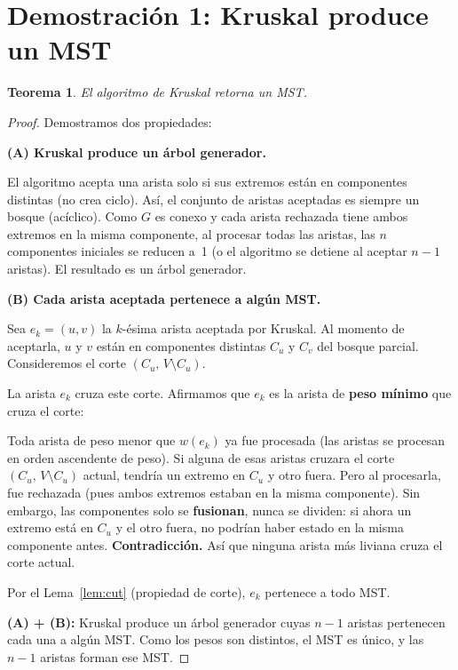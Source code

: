 \documentclass[11pt, letterpaper]{article}
\theoremstyle{definition}
\theoremstyle{plain}
\newtheorem{theorem}{Teorema}[section]
\theoremstyle{remark}
\begin{document}
\section{Demostración 1: Kruskal produce un MST}

\begin{theorem}\label{thm:kruskal}
El algoritmo de Kruskal retorna un MST.
\end{theorem}

\begin{proof}
Demostramos dos propiedades:

\textbf{(A) Kruskal produce un árbol generador.}

El algoritmo acepta una arista solo si sus extremos están en
componentes distintas (no crea ciclo). Así, el conjunto de aristas
aceptadas es siempre un bosque (acíclico). Como $G$ es conexo y
cada arista rechazada tiene ambos extremos en la misma componente,
al procesar todas las aristas, las $n$ componentes iniciales se
reducen a~1 (o el algoritmo se detiene al aceptar $n - 1$ aristas).
El resultado es un árbol generador. \checkmark

\textbf{(B) Cada arista aceptada pertenece a algún MST.}

Sea $e_k = (u, v)$ la $k$-ésima arista aceptada por Kruskal. Al
momento de aceptarla, $u$ y $v$ están en componentes distintas
$C_u$ y $C_v$ del bosque parcial. Consideremos el corte
$(C_u,\, V \setminus C_u)$.

La arista $e_k$ cruza este corte. Afirmamos que $e_k$ es la arista
de \textbf{peso mínimo} que cruza el corte:

Toda arista de peso menor que $w(e_k)$ ya fue procesada (las
aristas se procesan en orden ascendente de peso). Si alguna de esas
aristas cruzara el corte $(C_u,\, V \setminus C_u)$ actual,
tendría un extremo en $C_u$ y otro fuera. Pero al procesarla, fue
rechazada (pues ambos extremos estaban en la misma componente). Sin
embargo, las componentes solo se \textbf{fusionan}, nunca se
dividen: si ahora un extremo está en $C_u$ y el otro fuera, no
podrían haber estado en la misma componente antes.
\textbf{Contradicción.} Así que ninguna arista más liviana cruza el
corte actual.

Por el Lema~\ref{lem:cut} (propiedad de corte), $e_k$ pertenece a
todo MST. \checkmark

\textbf{(A) + (B):} Kruskal produce un árbol generador cuyas
$n - 1$ aristas pertenecen cada una a algún MST. Como los pesos son
distintos, el MST es único, y las $n - 1$ aristas forman ese MST.
\end{proof}
\end{document}
